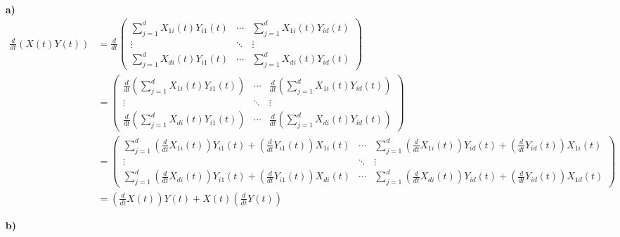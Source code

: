 \begin{solution}
\leavevmode \\
\begin{itemize}
  \item [\textbf{a)}]
  \begin{align*}
    \frac{d}{dt}(X(t)Y(t)) &= \frac{d}{dt}\left(\begin{array}{rrr}
    \sum_{j=1}^d X_{1i}(t)Y_{i1}(t) & \cdots & \sum_{j=1}^d X_{1i}(t)Y_{id}(t) \\
    \vdots & \ddots & \vdots \\
    \sum_{j=1}^d X_{di}(t)Y_{i1}(t) & \cdots & \sum_{j=1}^d X_{di}(t)Y_{id}(t)
    \end{array}\right) \\
    &=
    \left(\begin{array}{rrr}
    \frac{d}{dt}\left(\sum_{j=1}^d X_{1i}(t)Y_{i1}(t)\right) & \cdots &
    \frac{d}{dt}\left(\sum_{j=1}^d X_{1i}(t)Y_{id}(t)\right) \\
    \vdots & \ddots & \vdots \\
    \frac{d}{dt}\left(\sum_{j=1}^d X_{di}(t)Y_{i1}(t)\right) & \cdots &
    \frac{d}{dt}\left(\sum_{j=1}^d X_{di}(t)Y_{id}(t)\right)
    \end{array}\right) \\
    &= \left(\begin{array}{rrr}
    \sum_{j=1}^d \left(\frac{d}{dt}X_{1i}(t)\right)Y_{i1}(t) +
    \left(\frac{d}{dt}Y_{i1}(t)\right)X_{1i}(t) & \cdots &
    \sum_{j=1}^d \left(\frac{d}{dt}X_{1i}(t)\right)Y_{id}(t) +
    \left(\frac{d}{dt}Y_{id}(t)\right)X_{1i}(t) \\
    \vdots & \ddots & \vdots \\
    \sum_{j=1}^d \left(\frac{d}{dt}X_{di}(t)\right)Y_{i1}(t) +
    \left(\frac{d}{dt}Y_{i1}(t)\right)X_{di}(t) & \cdots &
    \sum_{j=1}^d \left(\frac{d}{dt}X_{di}(t)\right)Y_{id}(t) +
    \left(\frac{d}{dt}Y_{id}(t)\right)X_{1d}(t)
    \end{array}\right) \\
    &= \left(\frac{d}{dt}X(t)\right)Y(t) + X(t)\left(\frac{d}{dt}Y(t)\right)
  \end{align*}
  \item [\textbf{b)}]

\end{itemize}

\end{solution}
